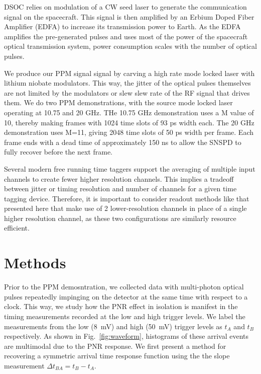\documentclass[11pt]{caltech_thesis} %
\begin{document}
DSOC relies on modulation of a CW seed laser to generate the
communication signal on the spacecraft. This signal is then amplified by
an Erbium Doped Fiber Amplifier (EDFA) to increase its transmission
power to Earth. As the EDFA amplifies the pre-generated pulses and uses
most of the power of the spacecraft optical transmission system, power
consumption scales with the number of optical pulses.

We produce our PPM signal signal by carving a high rate mode locked
laser with lithium niobate modulators. This way, the jitter of the
optical pulses themselves are not limited by the modulators or slew slew
rate of the RF signal that drives them. We do two PPM demonstrations,
with the source mode locked laser operating at 10.75 and 20 GHz. THe
10.75 GHz demonstration uses a M value of 10, thereby making frames with
1024 time slots of 93 ps width each. The 20 GHz demonstration uses M=11,
giving 2048 time slots of 50 ps width per frame. Each frame ends with a
dead time of approximately 150 ns to allow the SNSPD to fully recover
before the next frame.

Several modern free running time taggers support the averaging of
multiple input channels to create fewer higher resolution channels. This
implies a tradeoff between jitter or timing resolution and number of
channels for a given time tagging device. Therefore, it is important to
consider readout methods like that presented here that make use of 2
lower-resolution channels in place of a single higher resolution
channel, as these two configurations are similarly resource efficient.

\hypertarget{methods}{%
\section{Methods}\label{methods}}

Prior to the PPM demosntration, we collected data with multi-photon
optical pulses repeatedly impinging on the detector at the same time
with respect to a clock. This way, we study how the PNR effect in
isolation is manifest in the timing measurements recorded at the low and
high trigger levels. We label the measurements from the low
(8~mV) and high (50~mV) trigger levels as
$t_A$ and $t_B$ respectively. As shown in Fig.~\ref{fig:waveform},
histograms of these arrival events are multimodal due to the PNR
response. We first present a method for recovering a symmetric arrival
time response function using the the slope measurement
$\Delta t_{BA} = t_B - t_A$.
\end{document}
